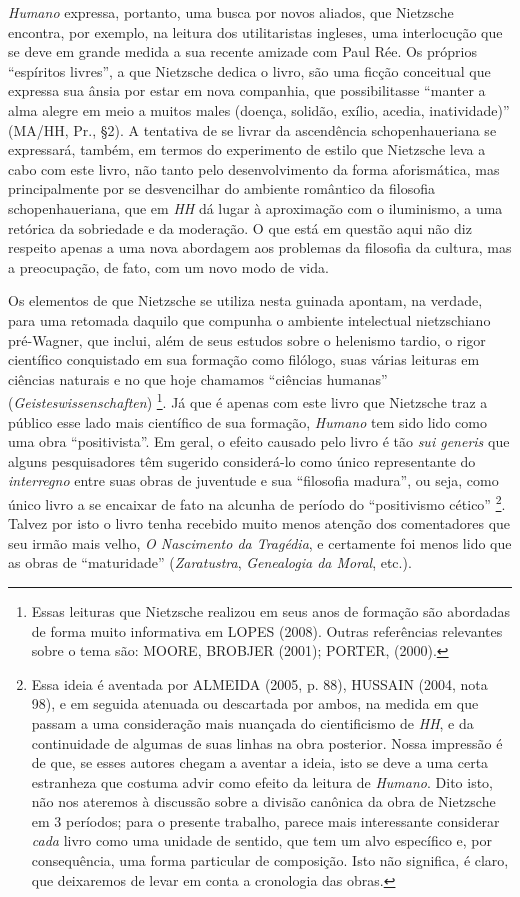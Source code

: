 \documentclass[
	12pt,				%
	openright,			%
	oneside,			%
	a4paper,			%
	english,			%
	french,				%
	spanish,			%
	brazil				%
	]{abntex2}
\newcommand{\Hum}{\textit{Humano}\xspace}
\begin{document}
	 \Hum expressa, portanto, uma busca por novos aliados, que Nietzsche encontra, por exemplo, na leitura dos utilitaristas ingleses, uma interlocução que se deve em grande medida a sua recente amizade com Paul Rée. Os próprios “espíritos livres”, a que Nietzsche dedica o livro, são uma ficção conceitual que expressa sua ânsia por estar em nova companhia, que possibilitasse “manter a alma alegre em meio a muitos males (doença, solidão, exílio, acedia, inatividade)” (MA/HH, Pr., §2). A tentativa de se livrar da ascendência schopenhaueriana se expressará, também, em termos do experimento de estilo que Nietzsche leva a cabo com este livro, não tanto pelo desenvolvimento da forma aforismática, mas principalmente por se desvencilhar do ambiente romântico da filosofia schopenhaueriana, que em \textit{HH} dá lugar à aproximação com o iluminismo, a uma retórica da sobriedade e da moderação. O que está em questão aqui não diz respeito apenas a uma nova abordagem aos problemas da filosofia da cultura, mas a preocupação, de fato, com um novo modo de vida. 

	Os elementos de que Nietzsche se utiliza nesta guinada apontam, na verdade, para uma retomada daquilo que compunha o ambiente intelectual nietzschiano pré-Wagner, que inclui, além de seus estudos sobre o helenismo tardio, o rigor científico conquistado em sua formação como filólogo, suas várias leituras em ciências naturais e no que hoje chamamos “ciências humanas” (\textit{Geisteswissenschaften})
\footnote{Essas leituras que Nietzsche realizou em seus anos de formação são abordadas de forma muito informativa em LOPES (2008). Outras referências relevantes sobre o tema são: MOORE, BROBJER (2001); PORTER, (2000).}. 
Já que é apenas com este livro que Nietzsche traz a público esse lado mais científico de sua formação, \Hum tem sido lido como uma obra “positivista”. Em geral, o efeito causado pelo livro é tão \textit{sui generis} que alguns pesquisadores têm sugerido considerá-lo como único representante do \textit{interregno} entre suas obras de juventude e sua “filosofia madura”, ou seja, como único livro a se encaixar de fato na alcunha de período do “positivismo cético”
\footnote{Essa ideia é aventada por ALMEIDA (2005, p. 88), HUSSAIN (2004, nota 98), e em seguida atenuada ou descartada por ambos, na medida em que passam a uma consideração mais nuançada do cientificismo de \textit{HH}, e da continuidade de algumas de suas linhas na obra posterior. Nossa impressão é de que, se esses autores chegam a aventar a ideia, isto se deve a uma certa estranheza que costuma advir como efeito da leitura de \textit{Humano}. Dito isto, não nos ateremos à discussão sobre a divisão canônica da obra de Nietzsche em 3 períodos; para o presente trabalho, parece mais interessante considerar \textit{cada} livro como uma unidade de sentido, que tem um alvo específico e, por consequência, uma forma particular de composição. Isto não significa, é claro, que deixaremos de levar em conta a cronologia das obras.}.
Talvez por isto o livro tenha recebido muito menos atenção dos comentadores que seu irmão mais velho, \textit{O Nascimento da Tragédia}, e certamente foi menos lido que as obras de “maturidade” (\textit{Zaratustra}, \textit{Genealogia da Moral}, etc.). 
\end{document}
